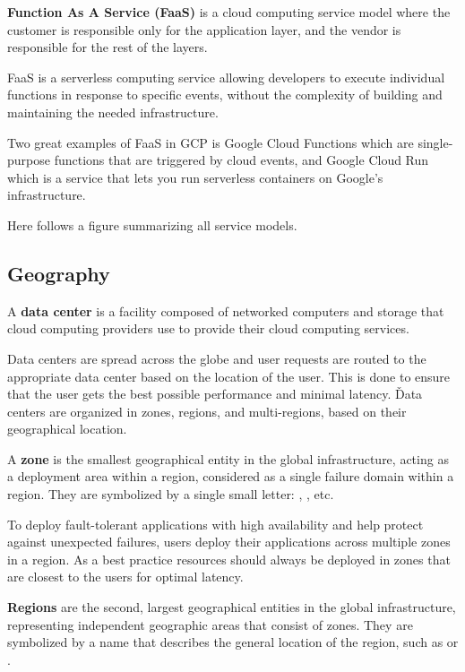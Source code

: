 \textbf{Function As A Service (FaaS)} is a cloud computing service model where the customer is responsible only for
the application layer, and the vendor is responsible for the rest of the layers.
\ed

FaaS is a serverless computing service allowing developers to execute individual functions in response to specific
events, without the complexity of building and maintaining the needed infrastructure.

\be
Two great examples of FaaS in GCP is Google Cloud Functions which are single-purpose functions that are triggered by
cloud events, and Google Cloud Run which is a service that lets you run serverless containers on Google's infrastructure.
\ee

Here follows a figure summarizing all service models.


\subsection{Geography}

A \textbf{data center} is a facility composed of networked computers and storage that cloud computing providers use to
provide their cloud computing services.
\ed

Data centers are spread across the globe and user requests are routed to the appropriate data center based on the
location of the user. This is done to ensure that the user gets the best possible performance and minimal latency. \v

Data centers are organized in zones, regions, and multi-regions, based on their geographical location.

\bd[Zone]
A \textbf{zone} is the smallest geographical entity in the global infrastructure, acting as a deployment area within a
region, considered as a single failure domain within a region. They are symbolized by a single small letter: ,
, etc.
\ed

To deploy fault-tolerant applications with high availability and help protect against unexpected failures, users
deploy their applications across multiple zones in a region. As a best practice resources should always be deployed
in zones that are closest to the users for optimal latency.

\bd[Region]
\textbf{Regions} are the second, largest geographical entities in the global infrastructure, representing independent
geographic areas that consist of zones. They are symbolized by a name that describes the general location of the region,
such as  or .
\ed

